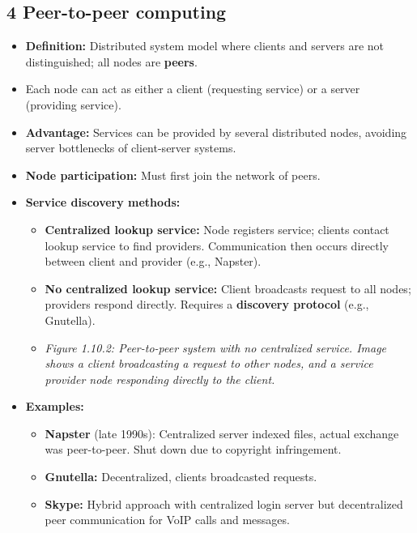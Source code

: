 \documentclass{article}
\begin{document}
\subsection*{4 Peer-to-peer computing}
\begin{itemize}
    \item \textbf{Definition:} Distributed system model where clients and servers are not distinguished; all nodes are \textbf{peers}.
    \item Each node can act as either a client (requesting service) or a server (providing service).
    \item \textbf{Advantage:} Services can be provided by several distributed nodes, avoiding server bottlenecks of client-server systems.
    \item \textbf{Node participation:} Must first join the network of peers.
    \item \textbf{Service discovery methods:}
    \begin{itemize}
        \item \textbf{Centralized lookup service:} Node registers service; clients contact lookup service to find providers. Communication then occurs directly between client and provider (e.g., Napster).
        \item \textbf{No centralized lookup service:} Client broadcasts request to all nodes; providers respond directly. Requires a \textbf{discovery protocol} (e.g., Gnutella).
        \item \textit{Figure 1.10.2: Peer-to-peer system with no centralized service. Image shows a client broadcasting a request to other nodes, and a service provider node responding directly to the client.}
    \end{itemize}
    \item \textbf{Examples:}
    \begin{itemize}
        \item \textbf{Napster} (late 1990s): Centralized server indexed files, actual exchange was peer-to-peer. Shut down due to copyright infringement.
        \item \textbf{Gnutella:} Decentralized, clients broadcasted requests.
        \item \textbf{Skype:} Hybrid approach with centralized login server but decentralized peer communication for VoIP calls and messages.
    \end{itemize}
\end{itemize}
\end{document}
